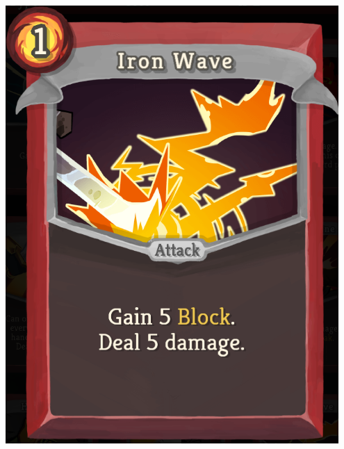 \begin{center}
\begin{minipage}{.25\textwidth}
        \includegraphics[width=0.95\textwidth]{img/Slay-the-Spire-Iron-Wave.png}
        \label{fig:sts-iron-wave}
    \end{minipage}%
    \begin{minipage}{.25\textwidth}
        \centering

\end{minipage}
\end{center}

